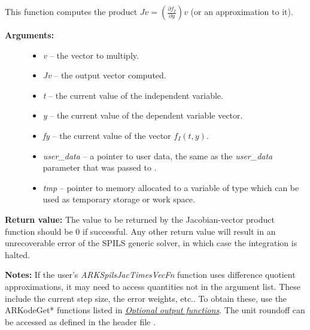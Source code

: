 \documentclass[letterpaper,10pt,english]{sphinxmanual}
\begin{document}
\begin{fulllineitems}
\label{c_interface/User_supplied:ARKSpilsJacTimesVecFn}
This function computes the product $Jv =
\left(\frac{\partial f_I}{\partial y}\right)v$ (or an approximation to it).
\begin{description}
\item[{\textbf{Arguments:}}] \leavevmode\begin{itemize}
\item {} 
\emph{v} -- the vector to multiply.

\item {} 
\emph{Jv} -- the output vector computed.

\item {} 
\emph{t} -- the current value of the independent variable.

\item {} 
\emph{y} -- the current value of the dependent variable vector.

\item {} 
\emph{fy} -- the current value of the vector $f_I(t,y)$.

\item {} 
\emph{user\_data} -- a pointer to user data, the same as the
\emph{user\_data} parameter that was passed to {\hyperref[c_interface/User_callable:ARKodeSetUserData]{}}.

\item {} 
\emph{tmp} -- pointer to memory allocated to a variable of type
 which can be used as temporary storage or work space.

\end{itemize}

\end{description}

\textbf{Return value:}
The value to be returned by the Jacobian-vector product
function should be 0 if successful. Any other return value will
result in an unrecoverable error of the SPILS generic solver,
in which case the integration is halted.

\textbf{Notes:} If the user's \emph{ARKSpilsJacTimesVecFn} function uses
difference quotient approximations, it may need to access
quantities not in the argument list.  These include the current
step size, the error weights, etc..  To obtain these, use the
ARKodeGet* functions listed in
{\hyperref[c_interface/User_callable:cinterface-optionaloutputs]{\emph{Optional output functions}}}. The unit roundoff can be
accessed as  defined in the header file
.

\end{fulllineitems}
\end{document}
